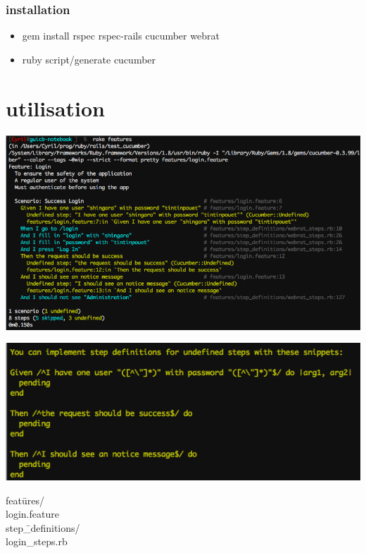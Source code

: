 \documentclass{beamer}
\begin{document}
\begin{frame}
  \frametitle{installation}
  \begin{itemize}
    \item gem install rspec rspec-rails cucumber webrat
    \item ruby script/generate cucumber
  \end{itemize}
\end{frame}

\section{utilisation}

\begin{frame}
  \includegraphics[scale=.4]{features_with_step_undefined}
\end{frame}

\begin{frame}
  \begin{center}
    \includegraphics[scale=.5]{step_missing}
  \end{center}
\end{frame}

\begin{frame}
  \begin{tabbing}
    feat\=ures/ \\
    \> login.feature \\
    \> step\=\_definitions/ \\
    \> \> login\_steps.rb \\
  \end{tabbing}
\end{frame}
\end{document}
